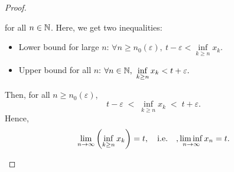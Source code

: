 \documentclass[11pt,openany]{article}
\begin{document}
\begin{proof}
\begin{enumerate}[(1)]
\begin{itemize}
\[	\] for all $n\in\mathbb{N}$. Here, we get two inequalities: \begin{itemize}
		\item Lower bound for large $n$: $
		\forall n\geq n_0(\varepsilon),\ t-\varepsilon < \inf\limits_{k\geq n}x_k.$
		\item Upper bound for all $n$: $\forall n\in\mathbb{N},\ \inf\limits_{k\geq n} x_k<t+\varepsilon.$
	\end{itemize}
	Then, for all $n\geq n_0(\varepsilon)$, \[
	t-\varepsilon \;<\; \inf\limits_{k\geq n} x_k \;<\; t+\varepsilon.
	\] Hence, \[
	\lim\limits_{n\to\infty}\left(\inf_{k\geq n} x_k\right)=t,\quad\textnormal{i.e.}\quad,\liminf\limits_{n \to \infty}x_n=t.
	\]
\end{itemize}
\end{enumerate}
\end{proof}
\end{document}
